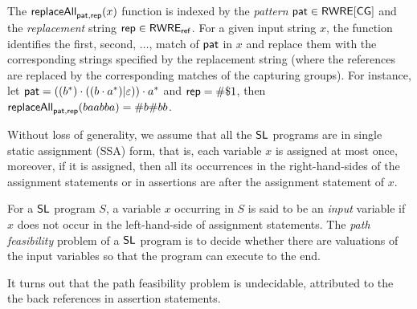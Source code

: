 The $\mathsf{replaceAll}_{\mathsf{pat}, \mathsf{rep}}(x)$ function is indexed by the  %
\emph{pattern} $\mathsf{pat} \in {\sf RWRE}[\sf CG]$ and the \emph{replacement} string $\mathsf{rep} \in {\sf RWRE_{ref}}$. For a given input string $x$, the function identifies the first, second, $\dots$, match of $\mathsf{pat}$ in $x$ and replace them with the corresponding strings specified by the replacement string (where the references are replaced by the corresponding matches of the capturing groups).  For instance, let $\mathsf{pat} = ((b^\ast) \cdot ((b \cdot a^\ast) | \varepsilon)) \cdot a^\ast$ and $\mathsf{rep} = \#\$1$, then  $\mathsf{replaceAll}_{\mathsf{pat}, \mathsf{rep}}(baabba) = \#b\#bb$. 

Without loss of generality, we assume that all the $\mathsf{SL}$ programs are in single static assignment (SSA) form, that is, each variable $x$ is assigned at most once, moreover, if it is assigned, then all its occurrences in the right-hand-sides of the assignment statements or in assertions are after the assignment statement of $x$.

For a $\mathsf{SL}$ program $S$, a variable $x$ occurring in $S$ is said to be an \emph{input} variable if $x$ does not occur in the left-hand-side of assignment statements. 
The \emph{path feasibility} problem of a $\mathsf{SL}$ program is to decide whether there are valuations of the input variables so that the program can execute to the end.


%





It turns out that the path feasibility problem is undecidable, attributed to the the back references in assertion statements. 

